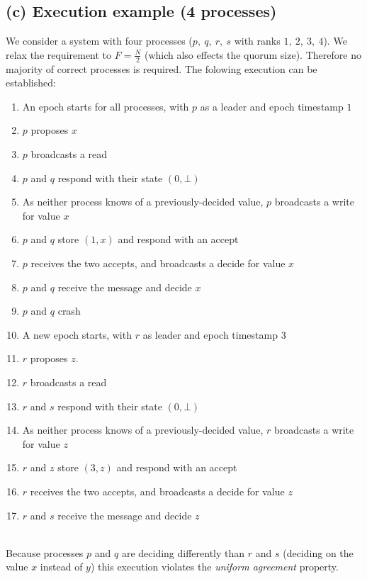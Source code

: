 \documentclass{article}
\begin{document}
\begin{adjustwidth}{2em}{2em}
		\subsection*{(c) Execution example (4 processes)}
		\begin{adjustwidth}{2em}{2em}
			We consider a system with four processes ($p, \ q, \ r, \ s$ with ranks $1, \ 2, \ 3, \ 4$). We relax the requirement to $F = \frac{N}{2}$ (which also effects the quorum size). Therefore no majority of correct processes is required. The folowing execution can be established: \\
			\begin{enumerate}[-]
				\item An epoch starts for all processes, with $p$ as a leader and epoch timestamp $1$
				\item $p$ proposes $x$
				\item $p$ broadcasts a read
				\item $p$ and $q$ respond with their state $(0, \bot)$
				\item As neither process knows of a previously-decided value, $p$ broadcasts a write for value $x$
				\item $p$ and $q$ store $(1, x)$ and respond with an accept
				\item $p$ receives the two accepts, and broadcasts a decide for value $x$
				\item $p$ and $q$ receive the message and decide $x$
				\item $p$ and $q$ crash
				\item A new epoch starts, with $r$ as leader and epoch timestamp $3$
				\item $r$ proposes $z$.
				\item $r$ broadcasts a read
				\item $r$ and $s$ respond with their state $(0, \bot)$
				\item As neither process knows of a previously-decided value, $r$ broadcasts a write for value $z$
				\item $r$ and $z$ store $(3, z)$ and respond with an accept
				\item $r$ receives the two accepts, and broadcasts a decide for value $z$
				\item $r$ and $s$ receive the message and decide $z$
			\end{enumerate}
			\hfill \\
			Because processes $p$ and $q$ are deciding differently than $r$ and $s$ (deciding on the value $x$ instead of $y$) this execution violates the \textit{uniform agreement} property.
		\end{adjustwidth}
	\end{adjustwidth}
	
\end{document}
